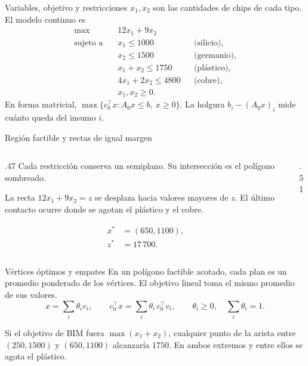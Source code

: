 \documentclass[aspectratio=169,12pt]{beamer}
\newcommand{\figuraPL}[2]{%
  \resizebox{!}{#2}{}}
\begin{document}
\begin{frame}{Variables, objetivo y restricciones}
$x_1,x_2$ son las cantidades de chips de cada tipo. El modelo continuo es
\[
\begin{aligned}
\max \quad &12x_1+9x_2\\
\text{sujeto a}\quad
 & x_1\le 1000 &&\text{(silicio)},\\
 & x_2\le 1500 &&\text{(germanio)},\\
 & x_1+x_2\le 1750 &&\text{(plástico)},\\
 & 4x_1+2x_2\le 4800 &&\text{(cobre)},\\
 & x_1,x_2\ge 0 .
\end{aligned}
\]
En forma matricial, $\max\{c_0^\top x:A_0x\le b,\ x\ge 0\}$.
La holgura $b_i-(A_0x)_i$ mide cuánto queda del insumo $i$.
\end{frame}

\begin{frame}{Región factible y rectas de igual margen}
\begin{columns}[c,onlytextwidth]
\begin{column}{.47\textwidth}
Cada restricción conserva un semiplano. Su intersección es el polígono sombreado.
\medskip

La recta $12x_1+9x_2=z$ se desplaza hacia valores mayores de $z$.
El último contacto ocurre donde se agotan el plástico y el cobre.
\medskip

\[
\begin{aligned}
x^*&=(650,1100),\\
z^*&=17\,700 .
\end{aligned}
\]
\end{column}
\begin{column}{.51\textwidth}
\centering
\figuraPL{pl_bim_region}{5.8cm}
\end{column}
\end{columns}
\end{frame}

\begin{frame}{Vértices óptimos y empates}
En un polígono factible acotado, cada plan es un promedio ponderado
de los vértices. El objetivo lineal toma el mismo promedio de sus valores.
\[
x=\sum_i\theta_i v_i,\qquad
c_0^\top x=\sum_i\theta_i\,c_0^\top v_i,\qquad
\theta_i\ge 0,\quad \sum_i\theta_i=1 .
\]
\medskip

Si el objetivo de BIM fuera $\max(x_1+x_2)$, cualquier punto de la arista
entre $(250,1500)$ y $(650,1100)$ alcanzaría $1750$.
En ambos extremos y entre ellos se agota el plástico.
\end{frame}
\end{document}
